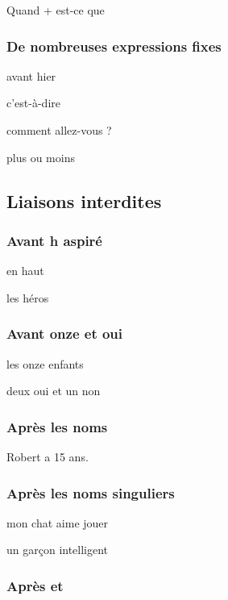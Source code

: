 \documentclass{article}
\begin{document}
Quand + est-ce que \textipa{[k\~a tEsk]}


\subsubsection{De nombreuses expressions fixes}

avant hier \textipa{[a v\~a tjEr]}

c’est-à-dire	\textipa{[sE ta dir]}

comment allez-vous ? \textipa{[cO m\~a ta le vu]}

plus ou moins	\textipa{[ply zu mw\~E]}


\subsection{Liaisons interdites}


\subsubsection{Avant h aspiré}

en haut \textipa{[\~a o]}

les héros \textipa{[lE e ro]}


\subsubsection{Avant onze et oui}

les onze enfants \textipa{[lE O z\~a f\~a]}

deux oui et un non \textipa{[d\o wi e \~a n\~O]}

\subsubsection{Après les noms}

Robert a 15 ans. \textipa{[rO bEr a k\~E z\~a]}

\subsubsection{Après les noms singuliers}

mon chat aime jouer \textipa{[m\~O Sa Em jue]}

un garçon intelligent \textipa{[\~a gar s\~O \~E tE li Z\~a]}


\subsubsection{Après et}
\end{document}
